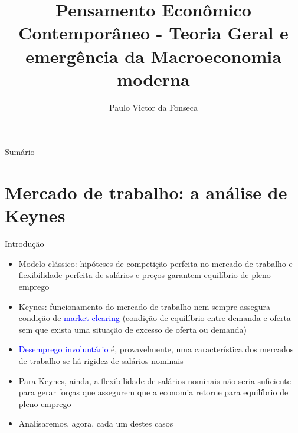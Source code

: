 \documentclass[10pt]{beamer}
\title[]{Pensamento Econômico Contemporâneo - Teoria Geral e emergência da Macroeconomia moderna}
\author[]{Paulo Victor da Fonseca}
\date{}
\begin{document}
\begin{frame}[plain]
\end{frame}

\begin{frame}{Sumário}
    \tableofcontents
\end{frame}

\section{Mercado de trabalho: a análise de Keynes}
\begin{frame}{Introdução}
    \begin{itemize}
        \item Modelo clássico: hipóteses de competição perfeita no mercado de trabalho e flexibilidade perfeita de salários e preços garantem equilíbrio de pleno emprego
        \bigskip
        \item Keynes: funcionamento do mercado de trabalho nem sempre assegura condição de \textcolor{blue}{market clearing} (condição de equilíbrio entre demanda e oferta sem que exista uma situação de excesso de oferta ou demanda)
        \bigskip
        \item \textcolor{blue}{Desemprego involuntário} é, provavelmente, uma característica dos mercados de trabalho se há rigidez de salários nominais
        \bigskip
        \item Para Keynes, ainda, a flexibilidade de salários nominais não seria suficiente para gerar forças que assegurem que a economia retorne para equilíbrio de pleno emprego
        \bigskip
        \item Analisaremos, agora, cada um destes casos
    \end{itemize}
\end{frame}
\end{document}
